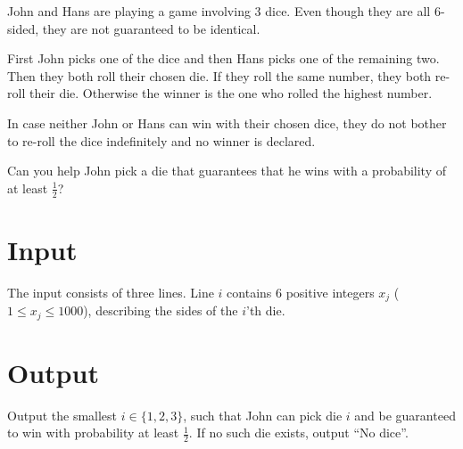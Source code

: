 
%

John and Hans are playing a game involving 3 dice. Even though they are
all 6-sided, they are not guaranteed to be identical.

\medskip

\noindent
First John picks one of the dice and then Hans picks one of the
remaining two. Then they both roll their chosen die. If they roll the
same number, they both re-roll their die. Otherwise the winner is the
one who rolled the highest number.

\noindent
In case neither John or Hans can win with their chosen dice, they do not bother to
re-roll the dice indefinitely and no winner is declared.

\medskip

\noindent
Can you help John pick a die that guarantees that he wins with a
probability of at least $\frac{1}{2}$?

\section*{Input}

The input consists of three lines. Line $i$ contains $6$ positive
integers $x_j$ ($1 \leq x_j \leq 1000$), describing the sides of the $i$'th die.

\section*{Output}

Output the smallest $i \in \{1, 2, 3\}$, such that John can pick die
$i$ and be guaranteed to win with probability at least $\frac{1}{2}$.
If no such die exists, output ``No dice''.

